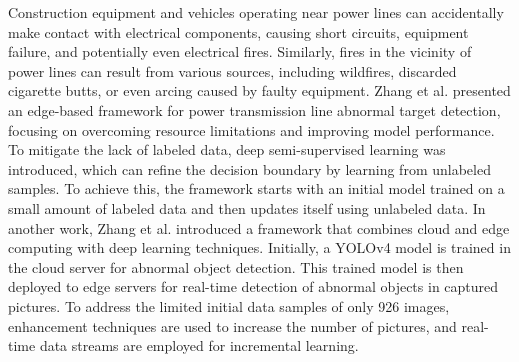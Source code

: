 Construction equipment and vehicles operating near power lines can accidentally make contact with electrical components, causing short circuits, equipment failure, and potentially even electrical fires. Similarly, fires in the vicinity of power lines can result from various sources, including wildfires, discarded cigarette butts, or even arcing caused by faulty equipment. Zhang et al. \cite{zhang_edge_2023} presented an edge-based framework for power transmission line abnormal target detection, focusing on overcoming resource limitations and improving model performance. To mitigate the lack of labeled data, deep semi-supervised learning was introduced, which can refine the decision boundary by learning from unlabeled samples. To achieve this, the framework starts with an initial model trained on a small amount of labeled data and then updates itself using unlabeled data. In another work, Zhang et al. \cite{zhang_cloud_edge_2020} introduced a framework that combines cloud and edge computing with deep learning techniques. Initially, a YOLOv4 model is trained in the cloud server for abnormal object detection. This trained model is then deployed to edge servers for real-time detection of abnormal objects in captured pictures. To address the limited initial data samples of only 926 images, enhancement techniques are used to increase the number of pictures, and real-time data streams are employed for incremental learning.

